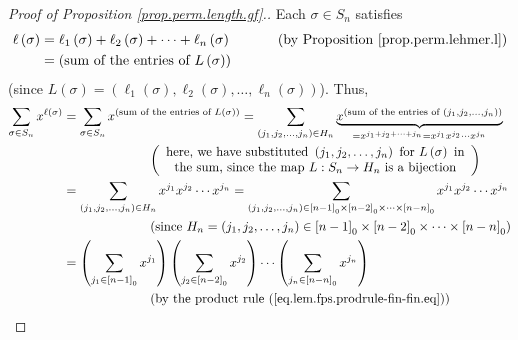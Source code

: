 \begin{proof}
[Proof of Proposition \ref{prop.perm.length.gf}.]Each $\sigma\in S_{n}$
satisfies
\begin{align*}
\ell\left(  \sigma\right)   &  =\ell_{1}\left(  \sigma\right)  +\ell
_{2}\left(  \sigma\right)  +\cdots+\ell_{n}\left(  \sigma\right)
\ \ \ \ \ \ \ \ \ \ \left(  \text{by Proposition \ref{prop.perm.lehmer.l}%
}\right) \\
&  =\left(  \text{sum of the entries of }L\left(  \sigma\right)  \right)
\end{align*}
(since $L\left(  \sigma\right)  =\left(  \ell_{1}\left(  \sigma\right)
,\ell_{2}\left(  \sigma\right)  ,\ldots,\ell_{n}\left(  \sigma\right)
\right)  $). Thus,%
\begin{align*}
\sum_{\sigma\in S_{n}}x^{\ell\left(  \sigma\right)  }  &  =\sum_{\sigma\in
S_{n}}x^{\left(  \text{sum of the entries of }L\left(  \sigma\right)  \right)
}=\sum_{\left(  j_{1},j_{2},\ldots,j_{n}\right)  \in H_{n}}%
\underbrace{x^{\left(  \text{sum of the entries of }\left(  j_{1},j_{2}%
,\ldots,j_{n}\right)  \right)  }}_{=x^{j_{1}+j_{2}+\cdots+j_{n}}=x^{j_{1}%
}x^{j_{2}}\cdots x^{j_{n}}}\\
&  \ \ \ \ \ \ \ \ \ \ \ \ \ \ \ \ \ \ \ \ \left(
\begin{array}
[c]{c}%
\text{here, we have substituted }\left(  j_{1},j_{2},\ldots,j_{n}\right)
\text{ for }L\left(  \sigma\right)  \text{ in}\\
\text{the sum, since the map }L:S_{n}\rightarrow H_{n}\text{ is a bijection}%
\end{array}
\right) \\
&  =\sum_{\left(  j_{1},j_{2},\ldots,j_{n}\right)  \in H_{n}}x^{j_{1}}%
x^{j_{2}}\cdots x^{j_{n}}=\sum_{\left(  j_{1},j_{2},\ldots,j_{n}\right)
\in\left[  n-1\right]  _{0}\times\left[  n-2\right]  _{0}\times\cdots
\times\left[  n-n\right]  _{0}}x^{j_{1}}x^{j_{2}}\cdots x^{j_{n}}\\
&  \ \ \ \ \ \ \ \ \ \ \ \ \ \ \ \ \ \ \ \ \left(  \text{since }H_{n}=\left(
j_{1},j_{2},\ldots,j_{n}\right)  \in\left[  n-1\right]  _{0}\times\left[
n-2\right]  _{0}\times\cdots\times\left[  n-n\right]  _{0}\right) \\
&  =\left(  \sum_{j_{1}\in\left[  n-1\right]  _{0}}x^{j_{1}}\right)  \left(
\sum_{j_{2}\in\left[  n-2\right]  _{0}}x^{j_{2}}\right)  \cdots\left(
\sum_{j_{n}\in\left[  n-n\right]  _{0}}x^{j_{n}}\right) \\
&  \ \ \ \ \ \ \ \ \ \ \ \ \ \ \ \ \ \ \ \ \left(  \text{by the product rule
(\ref{eq.lem.fps.prodrule-fin-fin.eq})}\right) \\

\end{align*}
\end{proof}
